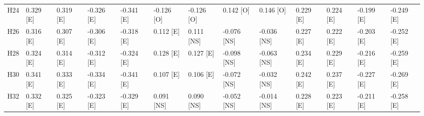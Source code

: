 \begin{table}[tbp]
\begin{tabular}{lllllllllllll}
H24 & 0.329 [E] & 0.319 [E] & -0.326 [E] & -0.341 [E] & -0.126 [O] & -0.126 [O] & 0.142 [O] & 0.146 [O] & 0.229 [E] & 0.224 [E] & -0.199 [E] & -0.249 [E] \\
H26 & 0.316 [E] & 0.307 [E] & -0.306 [E] & -0.318 [E] & 0.112 [E] & 0.111 [NS] & -0.076 [NS] & -0.036 [NS] & 0.227 [E] & 0.222 [E] & -0.203 [E] & -0.252 [E] \\
H28 & 0.324 [E] & 0.314 [E] & -0.312 [E] & -0.324 [E] & 0.128 [E] & 0.127 [E] & -0.098 [NS] & -0.063 [NS] & 0.234 [E] & 0.229 [E] & -0.216 [E] & -0.259 [E] \\
H30 & 0.341 [E] & 0.333 [E] & -0.334 [E] & -0.341 [E] & 0.107 [E] & 0.106 [E] & -0.072 [NS] & -0.032 [NS] & 0.242 [E] & 0.237 [E] & -0.227 [E] & -0.269 [E] \\
H32 & 0.332 [E] & 0.325 [E] & -0.323 [E] & -0.329 [E] & 0.091 [NS] & 0.090 [NS] & -0.052 [NS] & -0.014 [NS] & 0.228 [E] & 0.223 [E] & -0.211 [E] & -0.258 [E] \\
\bottomrule
\end{tabular}
\end{table}
